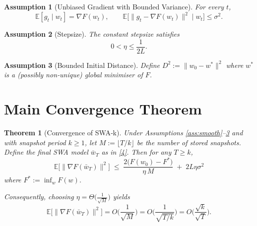 \documentclass{article}
\newtheorem{theorem}{Theorem}
\newtheorem{assumption}{Assumption}
\begin{document}
\begin{assumption}[Unbiased Gradient with Bounded Variance]\label{ass:unbiased}
For every $t$,
\[
\mathbb{E}[g_t\mid w_t]=\nabla F(w_t),\qquad 
\mathbb{E}\big[\|g_t-\nabla F(w_t)\|^{2}\mid w_t\big]\le\sigma^{2}.
\tag{A2}
\]
\end{assumption}

\begin{assumption}[Stepsize]\label{ass:stepsize}
The constant stepsize satisfies 
\[
0<\eta\le\frac{1}{2L}.
\tag{A3}
\]
\end{assumption}

\begin{assumption}[Bounded Initial Distance]\label{ass:init}
Define $D^{2}:=\|w_0-w^{*}\|^{2}$ where $w^{*}$ is a (possibly non‑unique) global minimiser of $F$.
\end{assumption}

\section*{Main Convergence Theorem}
\begin{theorem}[Convergence of SWA‑k]\label{thm:main}
Under Assumptions \ref{ass:smooth}--\ref{ass:init} and with snapshot period $k\ge1$, let $M:=\lfloor T/k\rfloor$ be the number of stored snapshots.  
Define the final SWA model $\bar w_T$ as in \eqref{4}.  
Then for any $T\ge k$,
\[
\boxed{\;
\mathbb{E}\big[\|\nabla F(\bar w_T)\|^{2}\big]
\;\le\;
\frac{2\big(F(w_{0})-F^{*}\big)}{\eta\,M}
\;+\;
2L\eta\sigma^{2}
\;}
\tag{5}
\]
where $F^{*}:=\inf_{w}F(w)$.  

Consequently, choosing $\eta=\Theta\!\big(\frac{1}{\sqrt{M}}\big)$ yields
\[
\mathbb{E}\big[\|\nabla F(\bar w_T)\|^{2}\big]=O\!\Big(\frac{1}{\sqrt{M}}\Big)
=O\!\Big(\frac{1}{\sqrt{T/k}}\Big)=O\!\Big(\frac{\sqrt{k}}{\sqrt{T}}\Big).
\]
\end{theorem}
\end{document}
